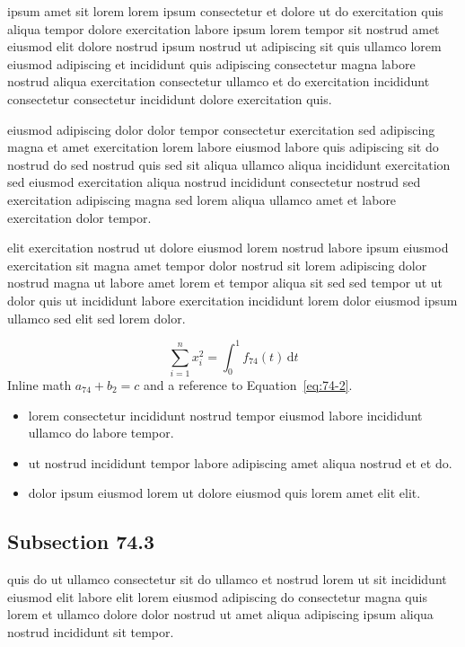 \documentclass{article}
\begin{document}
ipsum amet sit lorem lorem ipsum consectetur et dolore ut do exercitation quis aliqua tempor dolore exercitation labore ipsum lorem tempor sit nostrud amet eiusmod elit dolore nostrud ipsum nostrud ut adipiscing sit quis ullamco lorem eiusmod adipiscing et incididunt quis adipiscing consectetur magna labore nostrud aliqua exercitation consectetur ullamco et do exercitation incididunt consectetur consectetur incididunt dolore exercitation quis.

eiusmod adipiscing dolor dolor tempor consectetur exercitation sed adipiscing magna et amet exercitation lorem labore eiusmod labore quis adipiscing sit do nostrud do sed nostrud quis sed sit aliqua ullamco aliqua incididunt exercitation sed eiusmod exercitation aliqua nostrud incididunt consectetur nostrud sed exercitation adipiscing magna sed lorem aliqua ullamco amet et labore exercitation dolor tempor.

elit exercitation nostrud ut dolore eiusmod lorem nostrud labore ipsum eiusmod exercitation sit magna amet tempor dolor nostrud sit lorem adipiscing dolor nostrud magna ut labore amet lorem et tempor aliqua sit sed sed tempor ut ut dolor quis ut incididunt labore exercitation incididunt lorem dolor eiusmod ipsum ullamco sed elit sed lorem dolor.

\begin{equation}\label{eq:74-2}
  \sum_{i=1}^{n} x_i^{2} = \int_0^1 f_{74}(t)\,\mathrm{d}t
\end{equation}
Inline math $a_{74} + b_{2} = c$ and a reference to Equation~\eqref{eq:74-2}.

\begin{itemize}
  \item lorem consectetur incididunt nostrud tempor eiusmod labore incididunt ullamco do labore tempor.
  \item ut nostrud incididunt tempor labore adipiscing amet aliqua nostrud et et do.
  \item dolor ipsum eiusmod lorem ut dolore eiusmod quis lorem amet elit elit.
\end{itemize}

\subsection{Subsection 74.3}\label{sec:74-3}
quis do ut ullamco consectetur sit do ullamco et nostrud lorem ut sit incididunt eiusmod elit labore elit lorem eiusmod adipiscing do consectetur magna quis lorem et ullamco dolore dolor nostrud ut amet aliqua adipiscing ipsum aliqua nostrud incididunt sit tempor.
\end{document}

